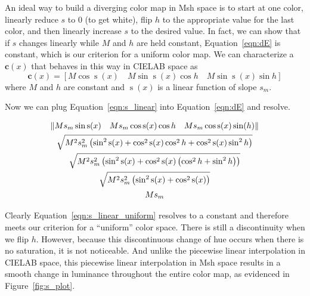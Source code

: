 \documentclass[review,journal]{vgtc}         %
\newcommand{\Lab}{CIELAB\xspace}
\newcommand{\Msh}{Msh\xspace}
\newcommand*{\cvec}[1]{\mathbf{#1}}
\begin{document}
An ideal way to build a diverging color map in \Msh space is to start at
one color, linearly reduce $s$ to 0 (to get white), flip $h$ to the
appropriate value for the last color, and then linearly increase $s$ to the
desired value.  In fact, we can show that if $s$ changes linearly while $M$
and $h$ are held constant, Equation~\ref{eqn:dE} is constant, which is our
criterion for a uniform color map.  We can characterize a $\cvec{c}(x)$ that
behaves in this way in \Lab space as
\begin{equation}
  \cvec{c}(x) = [ M \cos \operatorname{s}(x) \quad
  M \sin \operatorname{s}(x) \cos h \quad
  M \sin \operatorname{s}(x) \sin h ]
  \label{eqn:s_linear}
\end{equation}
where $M$ and $h$ are constant and $\operatorname{s}(x)$ is a linear
function of slope $s_m$.

Now we can plug Equation~\ref{eqn:s_linear} into Equation~\ref{eqn:dE} and
resolve.

\begin{equation}
  \begin{gathered}
    \left\lVert M s_m \sin\operatorname{s}(x) \quad
        M s_m \cos\operatorname{s}(x) \cos h \quad
        M s_m \cos\operatorname{s}(x) \sin(h) \right\rVert \\
    \sqrtsign{ M^2 s_m^2 \left( \sin^2 \operatorname{s}(x)
        + \cos^2 \operatorname{s}(x) \cos^2 h
        + \cos^2 \operatorname{s}(x) \sin^2 h \right) } \\
    \sqrtsign{ M^2 s_m^2 \left( \sin^2 \operatorname{s}(x)
        + \cos^2 \operatorname{s}(x) \left( \cos^2 h
          + \sin^2 h \right) \right) } \\
    \sqrtsign{ M^2 s_m^2 \left( \sin^2 \operatorname{s}(x)
        + \cos^2 \operatorname{s}(x) \right) } \\
    M s_m
    \label{eqn:s_linear_uniform}
  \end{gathered}
\end{equation}

Clearly Equation~\ref{eqn:s_linear_uniform} resolves to a constant and
therefore meets our criterion for a ``uniform'' color space.  There is still
a discontinuity when we flip $h$.  However, because this discontinuous
change of hue occurs when there is no saturation, it is not noticeable.
And unlike the piecewise linear interpolation in \Lab space, this piecewise
linear interpolation in \Msh space results in a smooth change in luminance
throughout the entire color map, as evidenced in Figure~\ref{fig:s_plot}.
\end{document}

